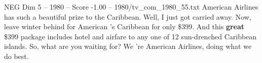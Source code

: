 \begin{textsample}{NEG Dim 5 – 1980 – Score -1.00 – 1980/tv\_com\_1980\_55.txt}  \label{ex:f5_neg_088}
American Airlines has such a beautiful prize to the Caribbean.
Well, I just got carried away.
Now, leave winter behind for American 's Caribbean for only \$399.
And this \textbf{great} \$399 package includes hotel and airfare to any one of 12 sun-drenched Caribbean islands.
So, what are you waiting for?
We 're American Airlines, doing what we do best.

\end{textsample}
